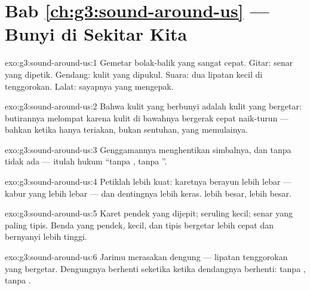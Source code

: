 \section*{Bab \ref{ch:g3:sound-around-us} --- Bunyi di Sekitar Kita}

\begin{solution}{exo:g3:sound-around-us:1}
Gemetar bolak-balik yang sangat cepat. Gitar: senar yang dipetik.
Gendang: kulit yang dipukul. Suara: dua lipatan kecil di tenggorokan.
Lalat: sayapnya yang mengepak.
\end{solution}

\begin{solution}{exo:g3:sound-around-us:2}
Bahwa kulit yang berbunyi adalah kulit yang bergetar: butirannya
melompat karena kulit di bawahnya bergerak cepat naik-turun --- bahkan
ketika hanya teriakan, bukan sentuhan, yang memulainya.
\end{solution}

\begin{solution}{exo:g3:sound-around-us:3}
Genggamannya menghentikan  simbalnya, dan tanpa  tidak
ada  --- itulah hukum ``tanpa , tanpa ''.
\end{solution}

\begin{solution}{exo:g3:sound-around-us:4}
Petiklah lebih kuat: karetnya berayun lebih lebar --- kabur yang lebih
lebar --- dan dentingnya lebih keras.  lebih besar,  lebih
besar.
\end{solution}

\begin{solution}{exo:g3:sound-around-us:5}
Karet pendek yang dijepit; seruling kecil; senar yang paling tipis.
Benda yang pendek, kecil, dan tipis bergetar lebih cepat dan bernyanyi
lebih tinggi.
\end{solution}

\begin{solution}{exo:g3:sound-around-us:6}
Jarimu merasakan dengung --- lipatan tenggorokan yang bergetar.
Dengungnya berhenti seketika ketika dendangnya berhenti: tanpa
, tanpa .
\end{solution}

